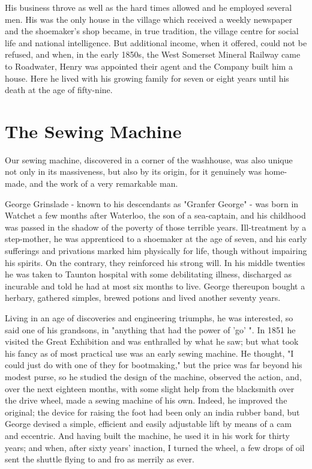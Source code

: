 His business throve as well as the hard times allowed and he employed several men. His was the only house in the village	which received	a weekly newspaper and the shoemaker's shop became, in true tradition, the village centre for social life and national intelligence. But additional income, when it offered, could not be refused, and when, in the early 1850s, the West Somerset Mineral Railway came to Roadwater, Henry was appointed their agent and the Company built him a house. Here he lived with his growing family for seven or eight years until his death at the age of fifty-nine.
 
\section{The Sewing Machine}  
 
Our sewing machine, discovered in a corner of	the washhouse,	was also unique not only in its massiveness, but	also by its	origin, for it	genuinely was home-made, and the work of a very remarkable man.

George Grinslade - known to his descendants as "Granfer George" - was born in Watchet a few months after Waterloo, the son of a sea-captain, and his childhood was passed in the shadow of the poverty of those terrible years. Ill-treatment by a step-mother, he was apprenticed to a shoemaker at the age of seven, and his early sufferings and privations marked him physically for life, though without impairing his spirits. On the contrary, they reinforced his strong will. In his middle twenties he was taken to Taunton hospital with some debilitating illness, discharged as incurable and told he had at most six months to live. George thereupon bought a herbary, gathered simples, brewed potions and lived another seventy years.

Living in an age of discoveries and engineering triumphs, he was interested, so said one of his grandsons, in "anything that had the power of 'go' ". In 1851 he visited the Great Exhibition and was enthralled by what he saw; but what took his fancy as of most practical use was an early sewing machine. He thought, "I could just do with one of they for bootmaking," but the price was far beyond his modest purse, so he studied the design of the machine, observed the action, and, over the next eighteen months, with some slight help from the blacksmith over the drive wheel, made a sewing machine of his own. Indeed, he improved the original; the device for raising the foot had been only an india rubber band, but George devised a simple, efficient and easily adjustable lift by means of a cam and eccentric. And having built the machine, he used it in his work for thirty years; and when, after sixty years’ inaction, I turned the wheel, a few drops of oil sent the shuttle flying to and fro as merrily as ever.

